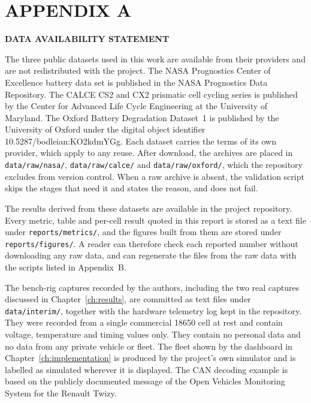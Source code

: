 \chapter*{APPENDIX A}

\begin{center}
\textbf{DATA AVAILABILITY STATEMENT}
\end{center}

The three public datasets used in this work are available from their providers and are not redistributed with the project. The NASA Prognostics Center of Excellence battery data set \cite{saha2007} is published in the NASA Prognostics Data Repository. The CALCE CS2 and CX2 prismatic cell cycling series \cite{calce} is published by the Center for Advanced Life Cycle Engineering at the University of Maryland. The Oxford Battery Degradation Dataset~1 \cite{howey2017oxford} is published by the University of Oxford under the digital object identifier 10.5287/bodleian:KO2kdmYGg. Each dataset carries the terms of its own provider, which apply to any reuse. After download, the archives are placed in \texttt{data/raw/nasa/}, \texttt{data/raw/calce/} and \texttt{data/raw/oxford/}, which the repository excludes from version control. When a raw archive is absent, the validation script skips the stages that need it and states the reason, and does not fail.

The results derived from these datasets are available in the project repository. Every metric, table and per-cell result quoted in this report is stored as a text file under \texttt{reports/}\allowbreak\texttt{metrics/}, and the figures built from them are stored under \texttt{reports/}\allowbreak\texttt{figures/}. A reader can therefore check each reported number without downloading any raw data, and can regenerate the files from the raw data with the scripts listed in Appendix~B.

The bench-rig captures recorded by the authors, including the two real captures discussed in Chapter~\ref{ch:results}, are committed as text files under \texttt{data/interim/}, together with the hardware telemetry log kept in the repository. They were recorded from a single commercial 18650 cell at rest and contain voltage, temperature and timing values only. They contain no personal data and no data from any private vehicle or fleet. The fleet shown by the dashboard in Chapter~\ref{ch:implementation} is produced by the project's own simulator and is labelled as simulated wherever it is displayed. The CAN decoding example is based on the publicly documented message of the Open Vehicles Monitoring System for the Renault Twizy.

